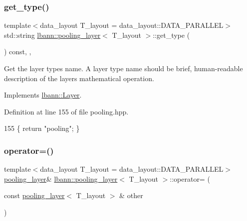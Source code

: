 \mbox{\label{classlbann_1_1pooling__layer_a2af67eebe2d051b141253bdba18f54ff}} 
\subsubsection{\texorpdfstring{get\+\_\+type()}{get\_type()}}
{\footnotesize\ttfamily template$<$data\+\_\+layout T\+\_\+layout = data\+\_\+layout\+::\+D\+A\+T\+A\+\_\+\+P\+A\+R\+A\+L\+L\+EL$>$ \\
std\+::string \hyperlink{classlbann_1_1pooling__layer}{lbann\+::pooling\+\_\+layer}$<$ T\+\_\+layout $>$\+::get\+\_\+type (\begin{DoxyParamCaption}{ }\end{DoxyParamCaption}) const\hspace{0.3cm}{\ttfamily [inline]}, {\ttfamily [override]}, {\ttfamily [virtual]}}

Get the layer type\textquotesingle{}s name. A layer type name should be brief, human-\/readable description of the layer\textquotesingle{}s mathematical operation. 

Implements \hyperlink{classlbann_1_1Layer_a0fa0ea9160b490c151c0a17fde4f7239}{lbann\+::\+Layer}.



Definition at line 155 of file pooling.\+hpp.


\begin{DoxyCode}
155 \{ \textcolor{keywordflow}{return} \textcolor{stringliteral}{"pooling"}; \}
\end{DoxyCode}
\mbox{\label{classlbann_1_1pooling__layer_acd09fc03a5c22c4127222b722c4d6ce5}} 
\subsubsection{\texorpdfstring{operator=()}{operator=()}}
{\footnotesize\ttfamily template$<$data\+\_\+layout T\+\_\+layout = data\+\_\+layout\+::\+D\+A\+T\+A\+\_\+\+P\+A\+R\+A\+L\+L\+EL$>$ \\
\hyperlink{classlbann_1_1pooling__layer}{pooling\+\_\+layer}\& \hyperlink{classlbann_1_1pooling__layer}{lbann\+::pooling\+\_\+layer}$<$ T\+\_\+layout $>$\+::operator= (\begin{DoxyParamCaption}\item[{const \hyperlink{classlbann_1_1pooling__layer}{pooling\+\_\+layer}$<$ T\+\_\+layout $>$ \&}]{other }\end{DoxyParamCaption})\hspace{0.3cm}{\ttfamily [inline]}}



